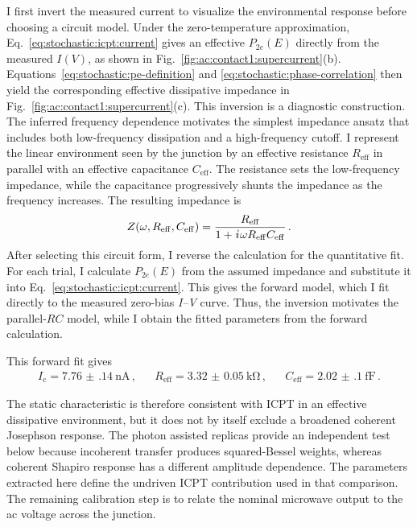         I first invert the measured current to visualize the environmental response before choosing a circuit model. Under the zero-temperature approximation, Eq.~\eqref{eq:stochastic:icpt:current} gives an effective $P_{2e}(E)$ directly from the measured $I(V)$, as shown in Fig.~\ref{fig:ac:contact1:supercurrent}(b). Equations~\eqref{eq:stochastic:pe-definition} and \eqref{eq:stochastic:phase-correlation} then yield the corresponding effective dissipative impedance in Fig.~\ref{fig:ac:contact1:supercurrent}(c). This inversion is a diagnostic construction. The inferred frequency dependence motivates the simplest impedance ansatz that includes both low-frequency dissipation and a high-frequency cutoff. I represent the linear environment seen by the junction by an effective resistance $R_\mathrm{eff}$ in parallel with an effective capacitance $C_\mathrm{eff}$. The resistance sets the low-frequency impedance, while the capacitance progressively shunts the impedance as the frequency increases. The resulting impedance is
        \begin{equation}
            Z(\omega,R_\mathrm{eff},C_\mathrm{eff}) = \frac{R_\mathrm{eff}}{1+ \ima\omega R_\mathrm{eff}C_\mathrm{eff}}\,.
            \label{eq:ac:photon-assisted-transport:impedance}
        \end{equation}
        After selecting this circuit form, I reverse the calculation for the quantitative fit. For each trial, I calculate $P_{2e}(E)$ from the assumed impedance and substitute it into Eq.~\eqref{eq:stochastic:icpt:current}. This gives the forward model, which I fit directly to the measured zero-bias \textit{I--V} curve. Thus, the inversion motivates the parallel-$RC$ model, while I obtain the fitted parameters from the forward calculation.

        This forward fit gives
        \begin{align}
            I_\mathrm{c} = \qty{7.76(14)}{\nano\ampere}\,, &&
            R_\mathrm{eff} = \qty{3.32(5)}{\kilo\ohm}\,, &&
            C_\mathrm{eff} = \qty{2.02(10)}{\femto\farad}\,.
            \label{eq:ac:contact1:icpt-parameter}
        \end{align}

        The static characteristic is therefore consistent with ICPT in an effective dissipative environment, but it does not by itself exclude a broadened coherent Josephson response. The photon assisted replicas provide an independent test below because incoherent transfer produces squared-Bessel weights, whereas coherent Shapiro response has a different amplitude dependence. The parameters extracted here define the undriven ICPT contribution used in that comparison. The remaining calibration step is to relate the nominal microwave output to the ac voltage across the junction.


